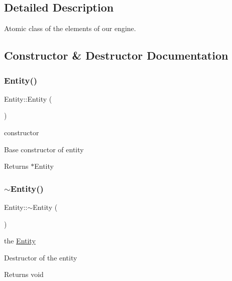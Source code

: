 \subsection{Detailed Description}
Atomic class of the elements of our engine. 

\subsection{Constructor \& Destructor Documentation}
\mbox{\label{class_entity_a980f368aa07ce358583982821533a54a}} 
\subsubsection{\texorpdfstring{Entity()}{Entity()}\hspace{0.1cm}{\footnotesize\ttfamily [1/2]}}
{\footnotesize\ttfamily Entity\+::\+Entity (\begin{DoxyParamCaption}{ }\end{DoxyParamCaption})}

constructor

Base constructor of entity

\begin{DoxyReturn}{Returns}
$\ast$\+Entity 
\end{DoxyReturn}
\mbox{\label{class_entity_adf6d3f7cb1b2ba029b6b048a395cc8ae}} 
\subsubsection{\texorpdfstring{$\sim$\+Entity()}{~Entity()}}
{\footnotesize\ttfamily Entity\+::$\sim$\+Entity (\begin{DoxyParamCaption}{ }\end{DoxyParamCaption})}

the \hyperlink{class_entity}{Entity}

Destructor of the entity

\begin{DoxyReturn}{Returns}
void 
\end{DoxyReturn}
\mbox{\label{class_entity_ad758dc48d715e48ada4193517f1d32ea}} 
